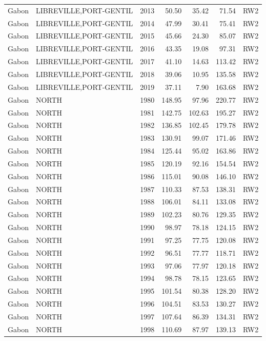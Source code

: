 \begin{longtable}{lllrrrl}
  Gabon & LIBREVILLE,PORT-GENTIL & 2013 & 50.50 & 35.42 & 71.54 & RW2 \\ 
  Gabon & LIBREVILLE,PORT-GENTIL & 2014 & 47.99 & 30.41 & 75.41 & RW2 \\ 
  Gabon & LIBREVILLE,PORT-GENTIL & 2015 & 45.66 & 24.30 & 85.07 & RW2 \\ 
  Gabon & LIBREVILLE,PORT-GENTIL & 2016 & 43.35 & 19.08 & 97.31 & RW2 \\ 
  Gabon & LIBREVILLE,PORT-GENTIL & 2017 & 41.10 & 14.63 & 113.42 & RW2 \\ 
  Gabon & LIBREVILLE,PORT-GENTIL & 2018 & 39.06 & 10.95 & 135.58 & RW2 \\ 
  Gabon & LIBREVILLE,PORT-GENTIL & 2019 & 37.11 & 7.90 & 163.68 & RW2 \\ 
  Gabon & NORTH & 1980 & 148.95 & 97.96 & 220.77 & RW2 \\ 
  Gabon & NORTH & 1981 & 142.75 & 102.63 & 195.27 & RW2 \\ 
  Gabon & NORTH & 1982 & 136.85 & 102.45 & 179.78 & RW2 \\ 
  Gabon & NORTH & 1983 & 130.91 & 99.07 & 171.46 & RW2 \\ 
  Gabon & NORTH & 1984 & 125.44 & 95.02 & 163.86 & RW2 \\ 
  Gabon & NORTH & 1985 & 120.19 & 92.16 & 154.54 & RW2 \\ 
  Gabon & NORTH & 1986 & 115.01 & 90.08 & 146.10 & RW2 \\ 
  Gabon & NORTH & 1987 & 110.33 & 87.53 & 138.31 & RW2 \\ 
  Gabon & NORTH & 1988 & 106.01 & 84.11 & 133.08 & RW2 \\ 
  Gabon & NORTH & 1989 & 102.23 & 80.76 & 129.35 & RW2 \\ 
  Gabon & NORTH & 1990 & 98.97 & 78.18 & 124.15 & RW2 \\ 
  Gabon & NORTH & 1991 & 97.25 & 77.75 & 120.08 & RW2 \\ 
  Gabon & NORTH & 1992 & 96.51 & 77.77 & 118.71 & RW2 \\ 
  Gabon & NORTH & 1993 & 97.06 & 77.97 & 120.18 & RW2 \\ 
  Gabon & NORTH & 1994 & 98.78 & 78.15 & 123.65 & RW2 \\ 
  Gabon & NORTH & 1995 & 101.54 & 80.38 & 128.20 & RW2 \\ 
  Gabon & NORTH & 1996 & 104.51 & 83.53 & 130.27 & RW2 \\ 
  Gabon & NORTH & 1997 & 107.64 & 86.39 & 134.31 & RW2 \\ 
  Gabon & NORTH & 1998 & 110.69 & 87.97 & 139.13 & RW2 \\ 

\end{longtable}
